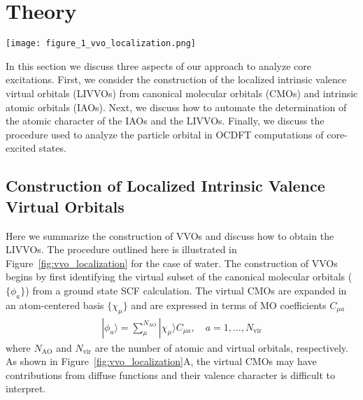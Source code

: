 \documentclass{article}
\begin{document}
%
%
\section{Theory}

\begin{figure*}[h!]
\texttt{[image: figure\_1\_vvo\_localization.png]}
\caption{Illustration of the procedure used to construct localized intrinsic valence virtual orbitals (LIVVOs). (A) Canonical molecular orbitals (CMOs) of water computed at the B3LYP/aug-cc-pVTZ level of theory. (B) Intrinsic atomic orbitals obtained from the CMOs of water and corresponding assignment to a given atom and angular momentum shell.
(C) Delocalized valence virtual orbitals (VVOs) obtained by singular value decomposition of the overlap matrix [eq~\eqref{eq:overlap}]. 
(D) Localized intrinsic valence virtual orbitals (LIVVOs) for water after Pipek-Mezey localization of the VVOs.}
\label{fig:vvo_localization}
\end{figure*}

In this section we discuss three aspects of our approach to analyze core excitations.
First, we consider the construction of the localized intrinsic valence virtual orbitals (LIVVOs) from canonical molecular orbitals (CMOs) and intrinsic atomic orbitals (IAOs).
Next, we discuss how to automate the determination of the atomic character of the  IAOs and the LIVVOs.
Finally, we discuss the procedure used to analyze the particle orbital in OCDFT computations of core-excited states.

\subsection{Construction of Localized Intrinsic Valence Virtual Orbitals}
Here we summarize the construction of VVOs and discuss how to obtain the LIVVOs.
The procedure outlined here is illustrated in Figure~\ref{fig:vvo_localization} for the case of water.
The construction of VVOs begins by first identifying the virtual subset of the canonical molecular orbitals ($\{ \phi_a\}$) from a ground state SCF calculation.
The virtual CMOs are expanded in an atom-centered basis $\{\chi_{\mu}\}$ and are expressed in terms of MO coefficients $C_{\mu a}$
\begin{align}
|\phi_a\rangle = \sum_{\mu}^{N_\mathrm{AO}} |\chi_{\mu} \rangle C_{\mu a}, \quad a = 1,\ldots,N_\mathrm{vir}
\end{align}
where $N_\mathrm{AO}$ and $N_\mathrm{vir}$ are the number of atomic and virtual orbitals, respectively.
As shown in Figure~\ref{fig:vvo_localization}A, the virtual CMOs may have contributions from diffuse functions and their valence character is difficult to interpret.
\end{document}
